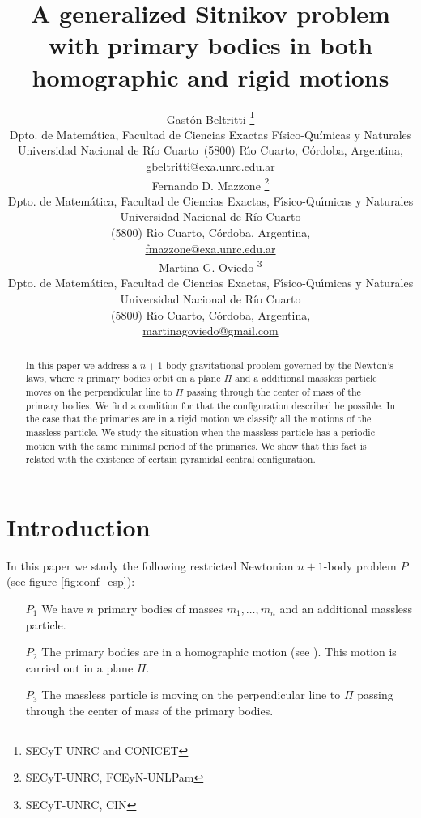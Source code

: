 \documentclass[twoside]{article}
\title{A generalized Sitnikov problem with primary bodies in both homographic and rigid motions}
\author{Gast\'on Beltritti \thanks{SECyT-UNRC and CONICET}\\
Dpto. de Matem\'atica, Facultad de Ciencias Exactas Físico-Químicas y Naturales\\
Universidad Nacional de R\'{i}o Cuarto\
(5800) R\'{\i}o Cuarto, C\'ordoba, Argentina,\\
\url{gbeltritti@exa.unrc.edu.ar}\\[3mm]
Fernando D. Mazzone \thanks{SECyT-UNRC, FCEyN-UNLPam}\\
Dpto. de Matem\'atica, Facultad de Ciencias Exactas, F\'{\i}sico-Qu\'{\i}micas y Naturales\\
Universidad Nacional de R\'{i}o Cuarto\\
(5800) R\'{\i}o Cuarto, C\'ordoba, Argentina,\\
\url{fmazzone@exa.unrc.edu.ar}\\
Martina G. Oviedo \thanks{SECyT-UNRC, CIN}\\
Dpto. de Matem\'atica, Facultad de Ciencias Exactas, F\'{\i}sico-Qu\'{\i}micas y Naturales\\
Universidad Nacional de R\'{i}o Cuarto\\
(5800) R\'{\i}o Cuarto, C\'ordoba, Argentina,\\
\url{martinagoviedo@gmail.com}
}
\date{}
\theoremstyle{remark}
\begin{document}
\maketitle
%
%
%
%
%

\begin{abstract}
In this paper we address a $n+1$-body gravitational problem governed by the Newton's laws, where $n$ primary bodies orbit on a plane $\Pi$ and a additional massless particle moves on the perpendicular line to $\Pi$ passing through the center of mass of the primary bodies. We find a condition for that the configuration described be possible. In the case that the primaries are in a rigid motion we classify all the motions of the massless particle. We study the situation when the massless particle has a periodic motion with the same minimal period of the primaries. We show that this fact is related with the existence of certain pyramidal central configuration.
\end{abstract}




\pagestyle{fancy} \headheight 35pt \fancyhead{} \fancyfoot{}

\fancyfoot[C]{\thepage}  \fancyhead[CO]{\nouppercase{\section}}

\fancyhead[CO]{\nouppercase{\leftmark}}






\section{Introduction}
In this paper we study the following restricted  Newtonian $n+1$-body problem $P$ (see figure \ref{fig:conf_esp}):
\begin{itemize}
 \item[$P_1$] We have $n$ primary bodies of masses $m_1,\ldots,m_n$ and an additional massless particle.
 \item[$P_2$] The primary bodies are in a homographic motion (see \cite[Section 2.9]{JaumeLlibre276}). This motion is carried out in a plane $\Pi$.
 \item[$P_3$] The massless particle is moving  on the perpendicular line to $\Pi$ passing through the center of mass of the primary bodies.
\end{itemize}
\end{document}
